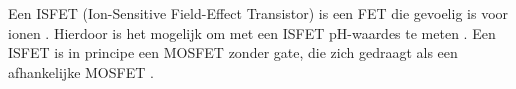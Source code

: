 Een ISFET (Ion-Sensitive Field-Effect Transistor) is een FET die gevoelig is voor ionen \cite{modeling,isfetAsAnElectronicDevice,bergveld1985impactOfMosfetBasedSensors,bergveld2003thirtyYearsISFET}. Hierdoor is het mogelijk om met een ISFET pH-waardes te meten \cite{modeling,isfetAsAnElectronicDevice,bergveld1985impactOfMosfetBasedSensors,bergveld2003thirtyYearsISFET}. Een ISFET is in principe een MOSFET zonder gate, die zich gedraagt als een \si{\pH} afhankelijke MOSFET
\cite{isfetAsAnElectronicDevice,bergveld1985impactOfMosfetBasedSensors,bergveld2003thirtyYearsISFET}.

